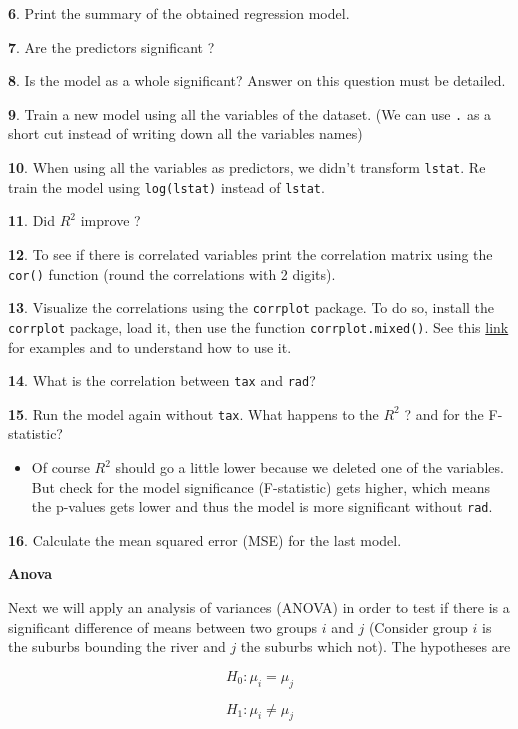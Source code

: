 \documentclass[]{book}
\newenvironment{rmdblock}[1]
  {\begin{shaded*}
  \begin{itemize}
  \renewcommand{\labelitemi}{
    \raisebox{-.7\height}[0pt][0pt]{
      {\setkeys{Gin}{width=2em,keepaspectratio}\texttt{[image: img/icons/\#1]}}
    }
  }
  \item
  }
  {
  \end{itemize}
  \end{shaded*}
  }
\newenvironment{rmdinsight}
  {\begin{rmdblock}{insight}}
  {\end{rmdblock}}
\theoremstyle{definition}
\theoremstyle{definition}
\theoremstyle{definition}
\theoremstyle{remark}
\begin{document}
\textbf{6}. Print the summary of the obtained regression model.

\textbf{7}. Are the predictors significant ?

\textbf{8}. Is the model as a whole significant? Answer on this question
must be detailed.

\textbf{9}. Train a new model using all the variables of the dataset.
(We can use \texttt{.} as a short cut instead of writing down all the
variables names)

\textbf{10}. When using all the variables as predictors, we didn't
transform \texttt{lstat}. Re train the model using \texttt{log(lstat)}
instead of \texttt{lstat}.

\textbf{11}. Did \(R^2\) improve ?

\textbf{12}. To see if there is correlated variables print the
correlation matrix using the \texttt{cor()} function (round the
correlations with 2 digits).

\textbf{13}. Visualize the correlations using the \texttt{corrplot}
package. To do so, install the \texttt{corrplot} package, load it, then
use the function \texttt{corrplot.mixed()}. See this
\href{https://cran.r-project.org/web/packages/corrplot/vignettes/corrplot-intro.html}{link}
for examples and to understand how to use it.

\textbf{14}. What is the correlation between \texttt{tax} and
\texttt{rad}?

\textbf{15}. Run the model again without \texttt{tax}. What happens to
the \(R^2\) ? and for the F-statistic?

\begin{rmdinsight}
Of course \(R^2\) should go a little lower because we deleted one of the
variables. But check for the model significance (F-statistic) gets
higher, which means the p-values gets lower and thus the model is more
significant without \texttt{rad}.
\end{rmdinsight}

\textbf{16}. Calculate the mean squared error (MSE) for the last model.

\textbf{Anova}

Next we will apply an analysis of variances (ANOVA) in order to test if
there is a significant difference of means between two groups \(i\) and
\(j\) (Consider group \(i\) is the suburbs bounding the river and \(j\)
the suburbs which not). The hypotheses are

\[ H_0 : \mu_i = \mu_j \]

\[ H_1 : \mu_i \neq \mu_j \]
\end{document}
